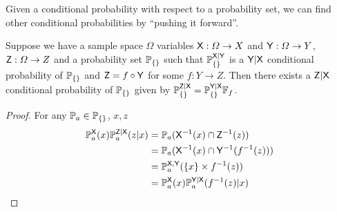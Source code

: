 Given a conditional probability with respect to a probability set, we can find other conditional probabilities by ``pushing it forward''.



\begin{theorem}\label{th:recurs_pushf}
Suppose we have a sample space $\Omega$ variables $\mathsf{X}:\Omega\to X$ and $\mathsf{Y}:\Omega\to Y$, $\mathsf{Z}:\Omega\to Z$ and a probability set $\mathbb{P}_{\{\}}$ such that $\mathbb{P}_{\{\}}^{\mathsf{X}|\mathsf{Y}}$ is a $\mathsf{Y}|\mathsf{X}$ conditional probability of $\mathbb{P}_{\{\}}$ and $\mathsf{Z}=f\circ \mathsf{Y}$ for some $f:Y\to Z$. Then there exists a $\mathsf{Z}|\mathsf{X}$ conditional probability of $\mathbb{P}_{\{\}}$ given by $\mathbb{P}_{\{\}}^{\mathsf{Z}|\mathsf{X}}=\mathbb{P}_{\{\}}^{\mathsf{Y}|\mathsf{X}}\mathbb{F}_{f}$.
\end{theorem}

\begin{proof}
For any $\mathbb{P}_a\in \mathbb{P}_{\{\}}$, $x,z$
\begin{align}
\mathbb{P}_a^{\mathsf{X}}(x)\mathbb{P}_a^{\mathsf{Z}|\mathsf{X}}(z|x) &= \mathbb{P}_a(\mathsf{X}^{-1}(x)\cap\mathsf{Z}^{-1}(z))\\
					   &= \mathbb{P}_a(\mathsf{X}^{-1}(x)\cap\mathsf{Y}^{-1}(f^{-1}(z)))\\
					   &= \mathbb{P}_a^{\mathsf{X},\mathsf{Y}}(\{x\}\times f^{-1}(z))\\
					   &= \mathbb{P}_a^{\mathsf{X}}(x)\mathbb{P}_a^{\mathsf{Y}|\mathsf{X}}(f^{-1}(z)|x)
\end{align}
\end{proof}

